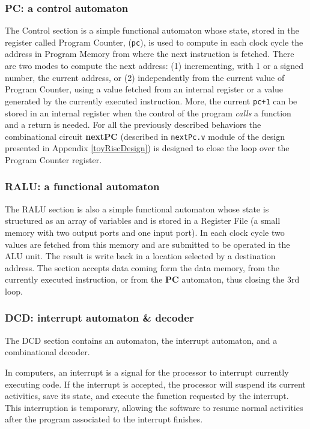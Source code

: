 \subsubsection{PC: a control automaton}

The Control section is a simple functional automaton whose
state, stored in the register called Program Counter, ({\tt pc}), is used
to compute in each clock cycle the address in Program Memory from where the next
instruction is fetched. There are two modes to compute the next
address: (1) incrementing, with 1 or a signed number, the current
address, or (2) independently from the
current value of Program Counter, using a value fetched from an internal
register or a value generated by the currently executed
instruction.  More,
the current {\tt pc+1} can be stored in an internal register when
the control of the program {\em calls} a  function and a return is
needed. For all the previously described behaviors the
combinational circuit {\bf nextPC} (described in {\tt nextPc.v} module of the design presented in Appendix \ref{toyRiscDesign}) is designed to close the loop over the Program Counter register.


\subsubsection{RALU: a functional automaton}

The RALU section is also a simple functional automaton whose state is structured as an array of variables and is stored in a Register File (a small memory with two output ports and one input port). In each clock cycle two values are fetched from this memory and are submitted to be operated in the ALU unit. The result is write back in a location selected by a destination address. The
section accepts data coming form the data memory,
from the currently executed instruction, or from the {\bf PC}
automaton, thus closing the 3rd loop.

\subsubsection{DCD: interrupt automaton \& decoder}\label{interrupt}

The DCD section contains an automaton, the interrupt automaton, and a combinational decoder.

In  computers, an interrupt  is a signal for the processor to interrupt currently executing code. If the interrupt is accepted, the processor will suspend its current activities, save its state, and execute the function requested by the interrupt.  This interruption is  temporary, allowing the software to resume normal activities after the program associated to the interrupt finishes.

